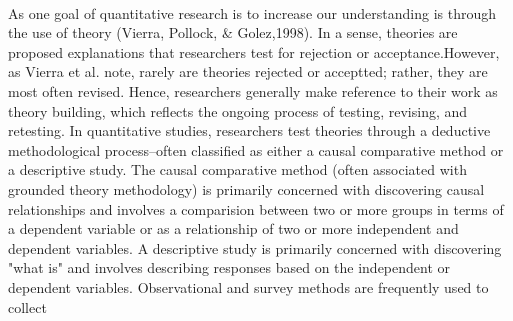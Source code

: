 \documentclass{book}
\begin{document}
\\\hspace*{0.5} As one goal of quantitative research is to increase our understanding is through the use of theory (Vierra, Pollock, & Golez,1998). In a sense, theories are proposed explanations that researchers test for rejection or acceptance.However, as Vierra et al. note, rarely are theories rejected or acceptted; rather, they are most often revised. Hence, researchers generally make reference to their work as theory building, which reflects the ongoing process of testing, revising, and retesting. In quantitative studies, researchers test theories through a deductive methodological process--often classified as either a causal comparative method or a descriptive study. The causal comparative method (often associated with grounded theory methodology) is primarily concerned with discovering causal relationships and involves a comparision between two or more groups in terms of a dependent variable or as a relationship of two or more independent and dependent variables. A descriptive study is primarily concerned with discovering "what is" and involves describing responses based on the independent or dependent variables. Observational and survey methods are frequently used to collect
\end{document}
